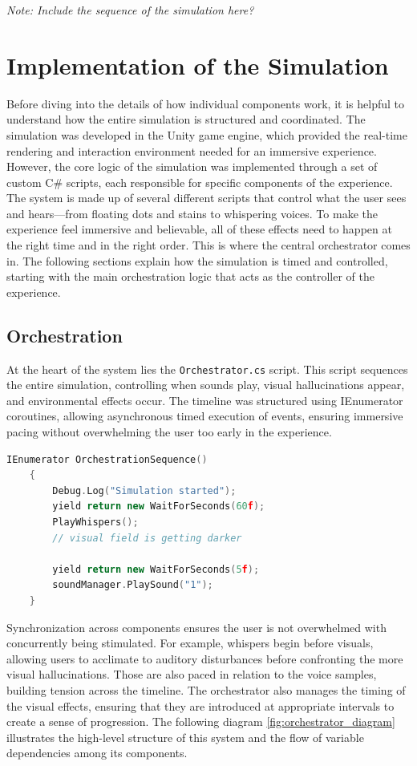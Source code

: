 \emph{Note: Include the sequence of the simulation here?}

\section{Implementation of the Simulation}

Before diving into the details of how individual components work, it is helpful to understand how the entire simulation is structured and coordinated. The simulation was developed in the Unity game engine, which provided the real-time rendering and interaction environment needed for an immersive experience. However, the core logic of the simulation was implemented through a set of custom C\# scripts, each responsible for specific components of the experience. The system is made up of several different scripts that control what the user sees and hears—from floating dots and stains to whispering voices. To make the experience feel immersive and believable, all of these effects need to happen at the right time and in the right order. This is where the central orchestrator comes in. The following sections explain how the simulation is timed and controlled, starting with the main orchestration logic that acts as the controller of the experience.

\subsection{Orchestration}
At the heart of the system lies the \texttt{Orchestrator.cs} script. This script sequences the entire simulation, controlling when sounds play, visual hallucinations appear, and environmental effects occur. The timeline was structured using IEnumerator coroutines, allowing asynchronous timed execution of events, ensuring immersive pacing without overwhelming the user too early in the experience.

\begin{lstlisting}[language=C++, caption={Orchestration Coroutine}, label={lst:orchestration}]
    IEnumerator OrchestrationSequence()
    {
        Debug.Log("Simulation started");
        yield return new WaitForSeconds(60f);
        PlayWhispers();
        // visual field is getting darker
    
        yield return new WaitForSeconds(5f);
        soundManager.PlaySound("1");
    }
    \end{lstlisting}
    

Synchronization across components ensures the user is not overwhelmed with concurrently being stimulated. For example, whispers begin before visuals, allowing users to acclimate to auditory disturbances before confronting the more visual hallucinations. Those are also paced in relation to the voice samples, building tension across the timeline.
The orchestrator also manages the timing of the visual effects, ensuring that they are introduced at appropriate intervals to create a sense of progression. The following diagram \ref{fig:orchestrator_diagram} illustrates the high-level structure of this system and the flow of variable dependencies among its components.

